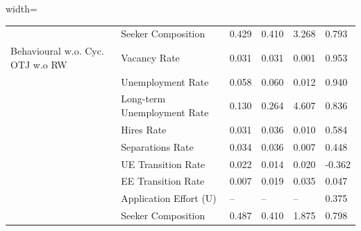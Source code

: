 \begin{table}[ht]
\begin{adjustbox}{width=\textwidth}
\begin{tabular}{llllll}
 & Seeker Composition & 0.429 & 0.410 & 3.268 & \cellcolor{yellow!25}0.793 \\
Behavioural w.o. Cyc. OTJ w.o RW & Vacancy Rate & 0.031 & 0.031 & \cellcolor{yellow!25}0.001 & \cellcolor{yellow!25}0.953 \\
 & Unemployment Rate & 0.058 & 0.060 & \cellcolor{black!15}0.012 & \cellcolor{black!30}0.940 \\
 & Long-term Unemployment Rate & 0.130 & 0.264 & 4.607 & \cellcolor{yellow!25}0.836 \\
 & Hires Rate & 0.031 & 0.036 & \cellcolor{red!25}0.010 & \cellcolor{yellow!25}0.584 \\
 & Separations Rate & 0.034 & 0.036 & \cellcolor{yellow!25}0.007 & \cellcolor{yellow!25}0.448 \\
 & UE Transition Rate & 0.022 & 0.014 & \cellcolor{red!25}0.020 & \cellcolor{red!25}-0.362 \\
 & EE Transition Rate & 0.007 & 0.019 & \cellcolor{red!25}0.035 & 0.047 \\
 & Application Effort (U) & -- & -- & -- & \cellcolor{red!25}0.375 \\
 & Seeker Composition & 0.487 & 0.410 & \cellcolor{red!25}1.875 & \cellcolor{yellow!25}0.798 \\
\bottomrule
\end{tabular}
\end{adjustbox}
\end{table}
